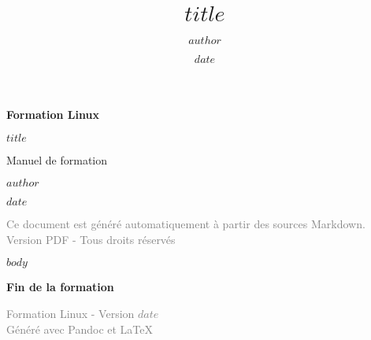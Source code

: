 \documentclass[a4paper,11pt]{article}
\title{\Huge\textbf{\textcolor{primarycolor}{$title$}}}
\author{$author$}
\date{$date$}
\begin{document}
\begin{titlepage}
    \centering
    \vspace*{2cm}
    
    {\Huge\textbf{\textcolor{primarycolor}{Formation Linux}}\par}
    \vspace{0.5cm}
    {\Large\textcolor{secondarycolor}{$title$}\par}
    \vspace{4cm}
    {\Large Manuel de formation\par}
    \vspace{1cm}
    {\large $author$\par}
    \vspace{0.5cm}
    {\large $date$\par}
    
    \vfill
    \textcolor{gray}{
        \small
        Ce document est généré automatiquement à partir des sources Markdown.\\
        Version PDF - Tous droits réservés
    }
\end{titlepage}

\newpage
\tableofcontents
\newpage

$body$

\newpage
\vspace*{\fill}
\begin{center}
    \textcolor{primarycolor}{\Large\textbf{Fin de la formation}}
    \vspace{1cm}
    
    \textcolor{gray}{
        Formation Linux - Version $date$\\
        Généré avec Pandoc et LaTeX
    }
\end{center}
\vspace*{\fill}
\end{document}
